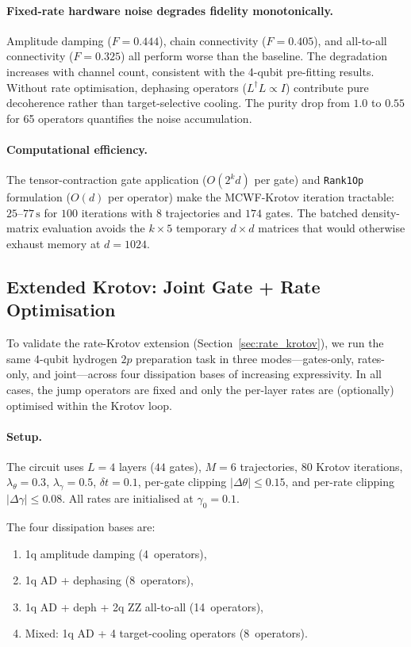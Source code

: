 \documentclass[11pt,a4paper]{article}
\begin{document}
\paragraph{Fixed-rate hardware noise degrades fidelity monotonically.}
Amplitude damping ($F = 0.444$), chain connectivity ($F = 0.405$),
and all-to-all connectivity ($F = 0.325$) all perform worse than the
baseline.  The degradation increases with channel count, consistent
with the 4-qubit pre-fitting results.  Without rate optimisation,
dephasing operators ($L^\dagger L \propto I$) contribute pure
decoherence rather than target-selective cooling.  The purity drop
from $1.0$ to $0.55$ for 65 operators quantifies the noise
accumulation.

\paragraph{Computational efficiency.}
The tensor-contraction gate application ($O(2^k d)$ per gate) and
\texttt{Rank1Op} formulation ($O(d)$ per operator) make the MCWF-Krotov
iteration tractable: $25$--$77\,\text{s}$ for $100$ iterations with
$8$ trajectories and $174$ gates.  The batched density-matrix
evaluation avoids the $k \times 5$ temporary $d \times d$ matrices
that would otherwise exhaust memory at $d = 1024$.


\subsection{Extended Krotov: Joint Gate + Rate Optimisation}
\label{sec:rate_results}

To validate the rate-Krotov extension (Section~\ref{sec:rate_krotov}),
we run the same 4-qubit hydrogen $2p$ preparation task in three modes---gates-only,
rates-only, and joint---across four dissipation bases of increasing
expressivity.  In all cases, the jump operators are fixed and only
the per-layer rates are (optionally) optimised within the Krotov loop.

\paragraph{Setup.}
The circuit uses $L = 4$ layers ($44$ gates), $M = 6$ trajectories,
$80$ Krotov iterations, $\lambda_\theta = 0.3$, $\lambda_\gamma = 0.5$,
$\delta t = 0.1$, per-gate clipping $|\Delta\theta| \le 0.15$, and
per-rate clipping $|\Delta\gamma| \le 0.08$.  All rates are initialised
at $\gamma_0 = 0.1$.

The four dissipation bases are:
\begin{enumerate}[nosep]
\item 1q amplitude damping (4~operators),
\item 1q AD + dephasing (8~operators),
\item 1q AD + deph + 2q ZZ all-to-all (14~operators),
\item Mixed: 1q AD + 4 target-cooling operators (8~operators).
\end{enumerate}
\end{document}

